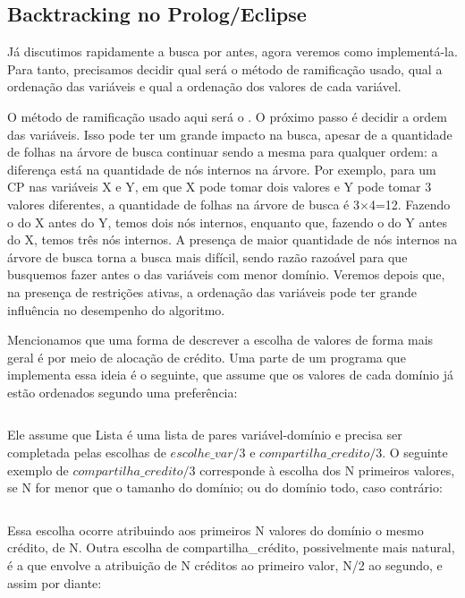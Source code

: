 \documentclass{article}
\begin{document}
\subsection{Backtracking no Prolog/Eclipse}

Já discutimos rapidamente a busca por  antes, agora veremos como implementá-la. Para tanto, precisamos decidir qual será o método de ramificação usado, qual a ordenação das variáveis e qual a ordenação dos valores de cada variável.

O método de ramificação usado aqui será o . O próximo passo é decidir a ordem das variáveis. Isso pode ter um grande impacto na busca, apesar de a quantidade de folhas na árvore de busca continuar sendo a mesma para qualquer ordem: a diferença está na quantidade de nós internos na árvore. Por exemplo, para um CP nas variáveis X e Y, em que X pode tomar dois valores e Y pode tomar 3 valores diferentes, a quantidade de folhas na árvore de busca é 3$\times$4=12. Fazendo o
do X antes do Y, temos dois nós internos, enquanto que, fazendo o  do Y antes do X, temos três nós internos. A presença de maior quantidade de nós internos na árvore de busca torna a busca mais difícil, sendo razão razoável para que busquemos fazer antes o  das variáveis com menor domínio. Veremos depois que, na presença de restrições ativas, a ordenação das variáveis pode ter grande influência no desempenho do algoritmo.

Mencionamos que uma forma de descrever a escolha de valores de forma mais geral é por meio de alocação de crédito. Uma parte de um programa que implementa essa ideia é o seguinte, que assume que os valores de cada domínio já estão ordenados segundo uma preferência:

\inputminted{prolog}{../Exemplos/Cap8/prog2_busca2.pl}

Ele assume que Lista é uma lista de pares variável-domínio e precisa ser completada pelas escolhas de $escolhe\_var/3$ e $compartilha\_credito/3$. O seguinte exemplo de $compartilha\_credito/3$ corresponde à escolha dos N primeiros valores, se N for menor
que o tamanho do domínio; ou do domínio todo,
caso contrário:

\inputminted{prolog}{../Exemplos/Cap8/prog3_partilha.pl}

Essa escolha ocorre atribuindo aos primeiros N valores do domínio o mesmo crédito, de N. Outra escolha de compartilha\_crédito, possivelmente mais natural, é a que envolve a atribuição de N créditos ao primeiro valor, N/2 ao segundo, e assim por diante:
\end{document}
